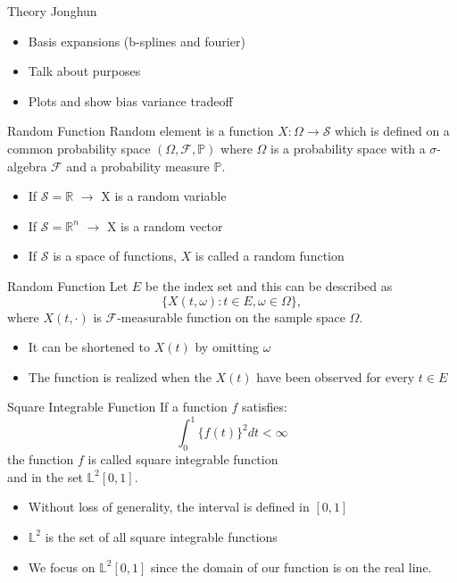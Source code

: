 \documentclass{beamer}
\begin{document}
	\begin{frame}{Theory}
		Jonghun
		\begin{itemize}
			\item Basis expansions (b-splines and fourier)
			\item Talk about purposes
			\item Plots and show bias variance tradeoff
		\end{itemize}
	\end{frame}

	\begin{frame}{Random Function}
		Random element is a function $X : \Omega \rightarrow \mathcal{S}$ which is defined on a common probability space $(\Omega, \mathcal{F}, \mathbb{P})$ where $\Omega$ is a probability space with a $\sigma$-algebra $\mathcal{F}$ and a probability measure $\mathbb{{P}}.$
		\begin{itemize}
			\item If $\mathcal{S} = \mathbb{R}$ $\rightarrow$ X is a random variable
			\item If $\mathcal{S} = \mathbb{R}^{n}$ $\rightarrow$ X is a random vector
			\item If $\mathcal{S}$ is a space of functions, $X$ is called a random function
		\end{itemize}
	\end{frame}

	\begin{frame}{Random Function}
		Let $E$ be the index set and this can be described as
		$${\{X(t,\omega) : t \in E, \omega \in \Omega\},}$$
		where $X(t, \cdot)$ is $\mathcal{F}$-measurable function on the sample space $\Omega$.\\
		\begin{itemize}
			\item It can be shortened to $X(t)$ by omitting $\omega$
			\item The function is realized when the $X(t)$ have been observed for every $t \in E$
		\end{itemize}
	\end{frame}
	
	\begin{frame}{Square Integrable Function}
		If a function $f$ satisfies:
		$$\int_{0}^{1} \{f(t)\}^{2}dt < \infty$$
		the function $f$ is called square integrable function\\
		and in the set $\mathbb{L}^{2}[0,1]$.
		\begin{itemize}
			\item Without loss of generality, the interval is defined in $[0,1] $
			\item $\mathbb{L}^{2}$ is the set of all square integrable functions
			\item We focus on $\mathbb{L}^{2} [0,1]$ since the domain of our function is on the real line.
		\end{itemize}
	\end{frame}
	
\end{document}
